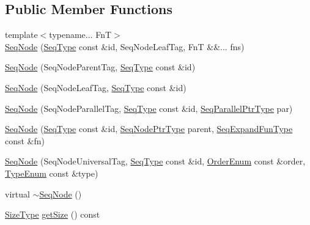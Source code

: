 \subsection*{Public Member Functions}
\begin{DoxyCompactItemize}
\item 
{\footnotesize template$<$typename... FnT$>$ }\\\hyperlink{structvt_1_1seq_1_1_seq_node_acd2c0bf2255d6ebbcc5bc586e333a999}{Seq\+Node} (\hyperlink{namespacevt_1_1seq_a3b612da217ac669d39c159f134ab8434}{Seq\+Type} const \&id, Seq\+Node\+Leaf\+Tag, FnT \&\&... fns)
\item 
\hyperlink{structvt_1_1seq_1_1_seq_node_a14943f6562b46ab0ad62eee36ec9a48f}{Seq\+Node} (Seq\+Node\+Parent\+Tag, \hyperlink{namespacevt_1_1seq_a3b612da217ac669d39c159f134ab8434}{Seq\+Type} const \&id)
\item 
\hyperlink{structvt_1_1seq_1_1_seq_node_abdfe423f4bd7ea2880247d446ce47224}{Seq\+Node} (Seq\+Node\+Leaf\+Tag, \hyperlink{namespacevt_1_1seq_a3b612da217ac669d39c159f134ab8434}{Seq\+Type} const \&id)
\item 
\hyperlink{structvt_1_1seq_1_1_seq_node_a619b5b49dc2dce8497582bd7ce695b64}{Seq\+Node} (Seq\+Node\+Parallel\+Tag, \hyperlink{namespacevt_1_1seq_a3b612da217ac669d39c159f134ab8434}{Seq\+Type} const \&id, \hyperlink{namespacevt_1_1seq_a050106112a0717f8e482465957fb2bfe}{Seq\+Parallel\+Ptr\+Type} par)
\item 
\hyperlink{structvt_1_1seq_1_1_seq_node_abeae2f846c0f061bdb30b0f36b1ed6af}{Seq\+Node} (\hyperlink{namespacevt_1_1seq_a3b612da217ac669d39c159f134ab8434}{Seq\+Type} const \&id, \hyperlink{namespacevt_1_1seq_ae6a4874b585be0612aaca32ca6d2d191}{Seq\+Node\+Ptr\+Type} parent, \hyperlink{namespacevt_1_1seq_ab345c700c06d135cafba39f711767ad5}{Seq\+Expand\+Fun\+Type} const \&fn)
\item 
\hyperlink{structvt_1_1seq_1_1_seq_node_a5e385a8ece70d313f3c20ba6505fff2b}{Seq\+Node} (Seq\+Node\+Universal\+Tag, \hyperlink{namespacevt_1_1seq_a3b612da217ac669d39c159f134ab8434}{Seq\+Type} const \&id, \hyperlink{namespacevt_1_1seq_a313357c71bba2bea5c57f50d69f1edf7}{Order\+Enum} const \&order, \hyperlink{namespacevt_1_1seq_ae721d4e8b95cf57a7e4169db1929e0f1}{Type\+Enum} const \&type)
\item 
virtual \hyperlink{structvt_1_1seq_1_1_seq_node_a6254d7b3d17294368a42153ac4164df1}{$\sim$\+Seq\+Node} ()
\item 
\hyperlink{structvt_1_1seq_1_1_seq_node_af2b8ae88c3519f2a6142915ddc974c9d}{Size\+Type} \hyperlink{structvt_1_1seq_1_1_seq_node_a1f7e5e4c59882bf4fb3b3ad5b9a2b71e}{get\+Size} () const

\end{DoxyCompactItemize}
